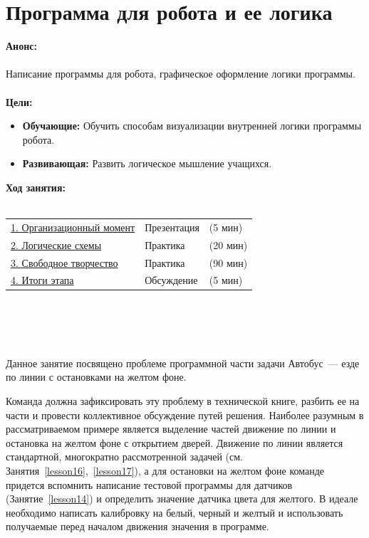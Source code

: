 \chapter{Программа для робота и ее логика}
{\bfseries Анонс:}\\\\
Написание программы для робота, графическое оформление логики программы.\\\\
{\bfseries Цели:}
\begin{itemize}
	\item{}{\bfseries Обучающие:} Обучить способам визуализации внутренней логики программы робота.   
	\item{}{\bfseries Развивающая:} Развить логическое мышление учащихся.\\
\end{itemize}	
{\bfseries Ход занятия:}\\\\
\begin{tabular}[h!]{lll}
	{\hyperlink{lesson28x1}{1. Организационный момент}}&{Презентация}&{(5 мин)}\\
	{\hyperlink{lesson28x2}{2. Логические схемы}}&{Практика}&{(20 мин)}\\
	{\hyperlink{lesson28x3}{3. Свободное творчество}}&{Практика}&{(90 мин)}\\
	{\hyperlink{lesson28x4}{4. Итоги этапа}}&{Обсуждение}&{(5 мин)}\\
\end{tabular}\\\\

{\hypertarget{lesson28x1}{}}\\\\

Данное занятие посвящено  проблеме программной части задачи Автобус~--- езде по линии с остановками на желтом фоне.

Команда должна зафиксировать эту проблему в технической книге, разбить ее на части и провести коллективное обсуждение путей решения. Наиболее разумным в рассматриваемом примере является выделение частей движение по линии и остановка на желтом фоне с открытием дверей. Движение по линии является стандартной, многократно рассмотренной задачей (см. Занятия~\ref{lesson16},~\ref{lesson17}), а для остановки на желтом фоне команде придется вспомнить написание тестовой программы для датчиков (Занятие~\ref{lesson14}) и определить значение датчика цвета для желтого. В идеале необходимо написать калибровку на белый, черный и желтый и использовать получаемые перед началом движения значения в программе.\\\\

